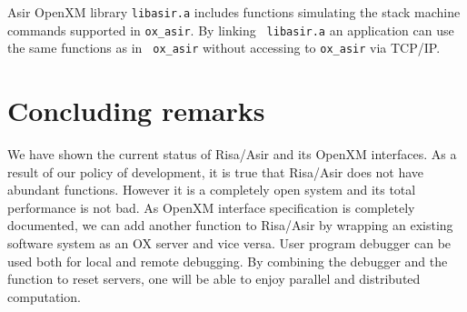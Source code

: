 \documentclass[runningheads]{cl2emult}
\begin{document}
Asir OpenXM library {\tt libasir.a} includes functions simulating the
stack machine commands supported in {\tt ox\_asir}.  By linking {\tt
libasir.a} an application can use the same functions as in {\tt
ox\_asir} without accessing to {\tt ox\_asir} via TCP/IP.

\section{Concluding remarks}
We have shown the current status of Risa/Asir and its OpenXM
interfaces. As a result of our policy of development, it is true that
Risa/Asir does not have abundant functions. However it is a completely
open system and its total performance is not bad. As OpenXM interface
specification is completely documented, we can add another function to
Risa/Asir by wrapping an existing software system as an OX server and
vice versa. User program debugger can be used both for local and
remote debugging. By combining the debugger and the function to reset
servers, one will be able to enjoy parallel and distributed
computation.
%
\end{document}
